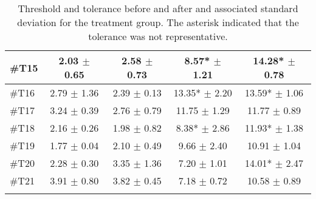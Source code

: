 \begin{longtable} {l|c|c|c|c}
\#T15 & 2.03 $\pm$ 0.65 & 2.58 $\pm$ 0.73  & 8.57* $\pm$ 1.21 & 14.28* $\pm$ 0.78 \\ \hline
\#T16 & 2.79 $\pm$ 1.36 & 2.39 $\pm$ 0.13 & 13.35* $\pm$ 2.20 & 13.59* $\pm$ 1.06 \\ \hline
\#T17 & 3.24 $\pm$ 0.39  & 2.76 $\pm$ 0.79   & 11.75 $\pm$ 1.29 & 11.77 $\pm$ 0.89 \\ \hline
\#T18 & 2.16 $\pm$ 0.26 & 1.98  $\pm$ 0.82 & 8.38* $\pm$ 2.86 & 11.93* $\pm$ 1.38 \\ \hline
\#T19 & 1.77 $\pm$ 0.04 & 2.10 $\pm$ 0.49 & 9.66 $\pm$ 2.40 & 10.91  $\pm$ 1.04 \\ \hline
\#T20 & 2.28 $\pm$ 0.30 & 3.35 $\pm$ 1.36 & 7.20 $\pm$ 1.01 & 14.01* $\pm$ 2.47 \\ \hline
\#T21 & 3.91 $\pm$ 0.80 &  3.82 $\pm$ 0.45 & 7.18 $\pm$ 0.72 & 10.58 $\pm$ 0.89 \\ \hline
	\caption{Threshold and tolerance before and after and associated standard deviation for the treatment group. The asterisk indicated that the tolerance was not representative.}
	\label{tab:TreatmentA}
\end{longtable}
\vspace{-.5cm}

